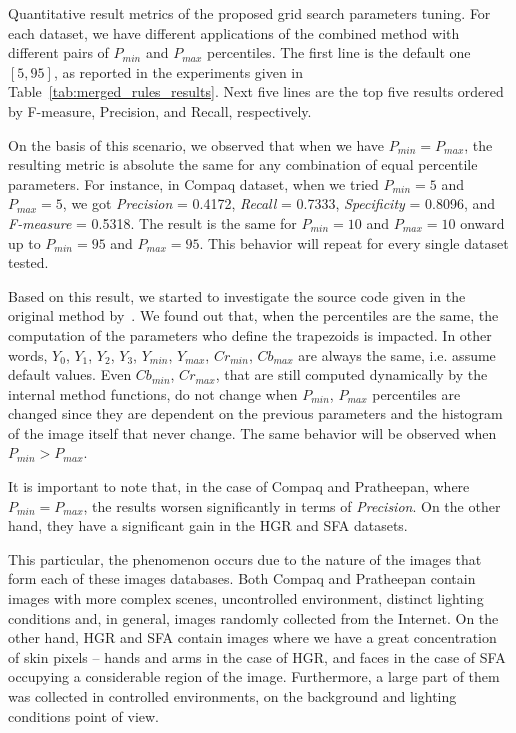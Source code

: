 \begin{table*}[ht]
\caption[Quantitative result metrics of the proposed grid search parameters tuning]{Quantitative result metrics of the proposed grid search parameters tuning. For each dataset, we have different applications of the combined method with different pairs of $P_{min}$ and $P_{max}$ percentiles. The first line is the default one $[5, 95]$, as reported in the experiments given in Table~\ref{tab:merged_rules_results}. Next five lines are the top five results ordered by F-measure, Precision, and Recall, respectively.}
\label{tab:gs_results_comparison}

\end{table*}

On the basis of this scenario, we observed that when we have $P_{min} = P_{max}$, the resulting metric is absolute the same for any combination of equal percentile parameters. For instance, in Compaq dataset, when we tried $P_{min} = 5$ and $P_{max} = 5$, we got \emph{Precision} = 0.4172, \emph{Recall} = 0.7333, \emph{Specificity} = 0.8096, and \emph{F-measure} = 0.5318. The result is the same for $P_{min} = 10$ and $P_{max} = 10$ onward up to $P_{min} = 95$ and $P_{max} = 95$. This behavior will repeat for every single dataset tested.

Based on this result, we started to investigate the source code given in the original method by~\citet{brancati:17}. We found out that, when the percentiles are the same, the computation of the parameters who define the trapezoids is impacted. In other words, $Y_0$, $Y_1$, $Y_2$, $Y_3$, $Y_{min}$, $Y_{max}$, $Cr_{min}$, $Cb_{max}$ are always the same, i.e. assume default values. Even $Cb_{min}$, $Cr_{max}$, that are still computed dynamically by the internal method functions, do not change when $P_{min}$, $P_{max}$ percentiles are changed since they are dependent on the previous parameters and the histogram of the image itself that never change. The same behavior will be observed when $P_{min} > P_{max}$.

It is important to note that, in the case of Compaq and Pratheepan, where $P_{min} = P_{max}$, the results worsen significantly in terms of \emph{Precision}. On the other hand, they have a significant gain in the HGR and SFA datasets.

This particular, the phenomenon occurs due to the nature of the images that form each of these images databases. Both Compaq and Pratheepan contain images with more complex scenes, uncontrolled environment, distinct lighting conditions and, in general, images randomly collected from the Internet. On the other hand, HGR and SFA contain images where we have a great concentration of skin pixels -- hands and arms in the case of HGR, and faces in the case of SFA occupying a considerable region of the image. Furthermore, a large part of them was collected in controlled environments, on the background and lighting conditions point of view.

